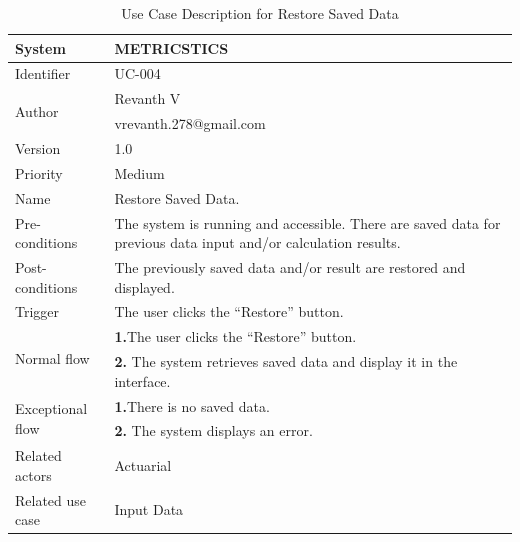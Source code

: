 \begin{table}[htb]
    \centering
    \begin{tabular}{|p{4cm}|p{12cm}|} \hline 
         System &  METRICSTICS\\ \hline 
         
         Identifier & UC-004 \\ \hline 
         
         \multirow{2}{*}{Author} & Revanth V  \\
         &vrevanth.278@gmail.com \\
           \hline 
           Version & 1.0\\ \hline
         
         Priority &  Medium\\ \hline 
         
         Name & Restore Saved Data. \\ \hline 
         Pre-conditions & The system is running and accessible.
There are saved data for previous data input and/or calculation results.\\ \hline 
         Post-conditions & The previously saved data and/or result are restored and displayed. \\ \hline
         Trigger & The user clicks the “Restore” button. \\ \hline
        \multirow{2}{*}{Normal flow} 
        & \textbf{1.}The user clicks the “Restore” button. \\ 
        & \textbf{2.} The system retrieves saved data and display it in the interface.  \\ 
         
         \hline
         \multirow{2}{*}{Exceptional flow} 
        & \textbf{1.}There is no saved data. \\ 
        & \textbf{2.} The system displays an error.  \\  \hline 
        Related actors & Actuarial  \\ \hline
        Related use case & Input Data \\ \hline
    \end{tabular}
    \caption{Use Case Description for Restore Saved Data}
    \label{tab:my_label}
\end{table}
